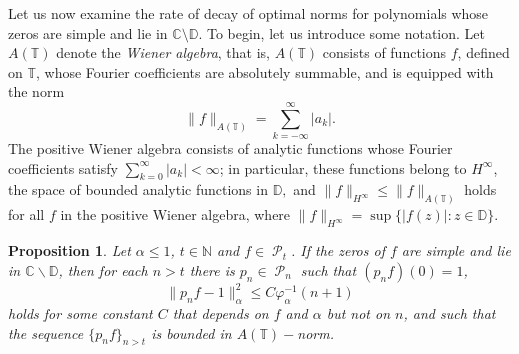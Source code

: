 \documentclass[11 pt,reqno]{amsart}
\newtheorem{prop}[thm]{Proposition}
\theoremstyle{definition}
\theoremstyle{remark}
\numberwithin{equation}{section} \numberwithin{figure}{section}
\newcommand{\CC}{{\mathbb C}}
\newcommand{\DD}{{\mathbb D}}
\newcommand{\TT}{{\mathbb T}}
\newcommand{\NN}{{\mathbb N}}
\DeclareMathOperator{\Pol}{{\mathcal P}}
\begin{document}
Let us now examine the rate of decay of optimal norms for polynomials whose zeros are simple
and lie in $\CC\setminus\DD$.  To begin, let us introduce some notation.
Let $A(\TT)$ denote the {\it Wiener algebra}, that is, $A(\TT)$ consists of
functions $f$, defined on $\TT$, whose Fourier coefficients are absolutely summable,
and is equipped with the norm
\[\|f\|_{A(\TT)}=\sum_{k=-\infty}^{\infty}|a_k|.\]
The positive Wiener algebra consists of analytic functions whose Fourier coefficients
satisfy $\sum_{k=0}^{\infty}|a_k|<\infty$; in particular, these functions belong to
$H^{\infty}$, the space of bounded analytic functions in $\DD,$ and
$\|f\|_{H^{\infty}}\leq \|f\|_{A(\TT)}$ holds for all $f$ in the positive Wiener algebra, where
$\|f\|_{H^{\infty}}=\sup\{|f(z)|\colon z\in\DD\}$.


\begin{prop}\label{prop43}
Let $\alpha\leq 1$, $t \in\NN$ and $f\in\Pol_{t}$.  If the zeros of $f$ are simple
and lie in $\CC\backslash\DD$, then for each $n>t$ there is $p_{n}\in\Pol_{n}$ such that
$(p_{n}f)(0)=1$,
\begin{equation}\label{distPhiEstimate}
            \|p_{n} f -1 \|^2_\alpha \leq C \varphi_{\alpha}^{-1}(n+1)
\end{equation}
holds for some constant $C$ that depends on $f$ and $\alpha$ but not on $n$, and such that
the sequence $\{p_{n} f\}_{n>t}$ is bounded in $A(\TT)-$norm.
\end{prop}
\end{document}
